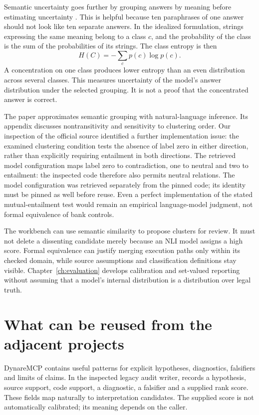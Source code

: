 Semantic uncertainty goes further by grouping answers by meaning before
estimating uncertainty \citep[sections 3--4]{semantic2023}. This is helpful because
ten paraphrases of one answer should not look like ten separate answers. In the
idealized formulation, strings expressing the same meaning belong to a class
$c$, and the probability of the class is the sum of the probabilities of its
strings. The class entropy is then
\begin{equation}
 H(C)=-\sum_c p(c)\log p(c).
 \label{eq:semantic-entropy}
\end{equation}
A concentration on one class produces lower entropy than an even distribution
across several classes. This measures uncertainty of the model's answer
distribution under the selected grouping. It is not a proof that the concentrated
answer is correct.

The paper approximates semantic grouping with natural-language inference. Its
appendix discusses nontransitivity and sensitivity to clustering order. Our
inspection of the official source identified a further implementation issue: the
examined clustering condition tests the absence of label zero in either direction,
rather than explicitly requiring entailment in both directions. The retrieved model configuration maps label zero to contradiction, one to
neutral and two to entailment: the inspected code therefore also permits neutral
relations. The model configuration was retrieved separately from the pinned code;
its identity must be pinned as well before reuse. Even a
perfect implementation of the stated mutual-entailment test would remain an
empirical language-model judgment, not formal equivalence of bank controls.

The workbench can use semantic similarity to propose clusters for review. It
must not delete a dissenting candidate merely because an NLI model assigns a
high score. Formal equivalence can justify merging execution paths only within
its checked domain, while source assumptions and classification definitions stay
visible. Chapter~\ref{ch:evaluation} develops calibration and set-valued reporting
without assuming that a model's internal distribution is a distribution over
legal truth.

\section{What can be reused from the adjacent projects}

DynareMCP contains useful patterns for explicit hypotheses, diagnostics,
falsifiers and limits of claims. In the inspected legacy audit writer,
 records a hypothesis, source support, code support,
a diagnostic, a falsifier and a supplied rank score. These fields map naturally
to interpretation candidates. The supplied score is not automatically calibrated;
its meaning depends on the caller.

